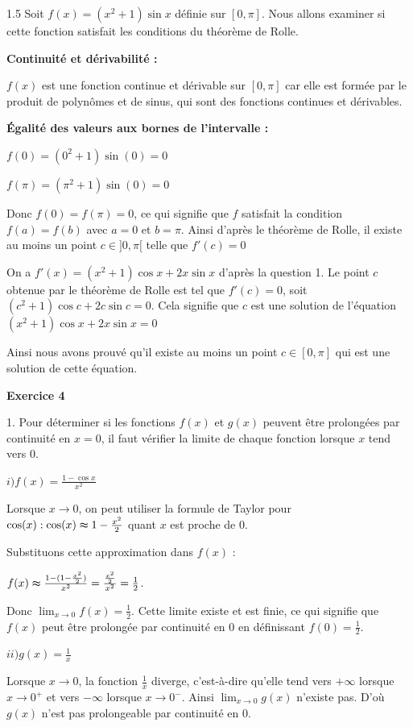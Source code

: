 \documentclass[12pt]{article}
\begin{document}
\begin{spacing}{1.5}
\medskip Soit $f(x)=(x^2+1)\sin x$ définie sur $[0,\pi]$. Nous allons examiner si cette fonction satisfait les conditions du théorème de Rolle.

\textbf{Continuité et dérivabilité :} 

$f(x)$ est une fonction continue et dérivable sur $[0,\pi]$ car elle est formée par le produit de polynômes et de sinus, qui sont des fonctions continues et dérivables.

\textbf{Égalité des valeurs aux bornes de l'intervalle :}

$f(0)=(0^2+1)\sin(0)=0$

$f(\pi)=(\pi^2+1)\sin(0)=0$

Donc $f(0)=f(\pi)=0$, ce qui signifie que $f$ satisfait la condition $f(a)=f(b)$ avec $a=0$ et $b=\pi$. Ainsi d'après le théorème de Rolle, il existe au moins un point $c\in ]0,\pi[$ telle que $f'(c)=0$

On a $f'(x)=(x^2+1)\cos x+2x\sin x$ d'après la question 1. Le point $c$ obtenue par le théorème de Rolle est tel que $f'(c)=0$, soit $(c^2+1)\cos c+2c\sin c=0$. Cela signifie que $c$ est une solution de l'équation  $(x^2+1)\cos x+2x\sin x=0$

\medskip Ainsi nous avons prouvé qu'il existe au moins un point $c\in [0,\pi]$ qui est une solution de cette équation.

\medskip\textbf{Exercice 4}

1. Pour déterminer si les fonctions $f(x)$ et $g(x)$ peuvent être prolongées par continuité en $x=0$, il faut vérifier la limite de chaque fonction lorsque $x$ tend vers 0.

\medskip $i)f(x)=\frac{1-\cos x}{x^2}$

Lorsque $x\rightarrow 0$, on peut utiliser la formule de Taylor pour $\cos(x):\cos(x)\thickapprox 1-\frac{x^2}{2}$ quant $x$ est proche de 0.

Substituons cette approximation dans  $f(x)$ :

$f(x)\thickapprox \frac{1-(1-\frac{x^2}{2})}{x^2}=\frac{\frac{x^2}{2}}{x^2}=\frac{1}{2}$.

Donc $\lim_{x\to 0}f(x)=\frac{1}{2}$. Cette limite existe et est finie, ce qui signifie que $f(x)$ peut être prolongée par continuité en 0 en définissant $f(0)=\frac{1}{2}$.

$ii) g(x)=\frac{1}{x}$

Lorsque $x\rightarrow 0$, la fonction $\frac{1}{x}$ diverge, c'est-à-dire qu'elle tend vers $+\infty$ lorsque $x\rightarrow 0^+$ et vers $-\infty$ lorsque $x\rightarrow 0^-$. Ainsi $\lim_{x\to 0}g(x)$ n'existe pas. D'où $g(x)$ n'est pas prolongeable par continuité en 0.


\end{spacing}
\end{document}

